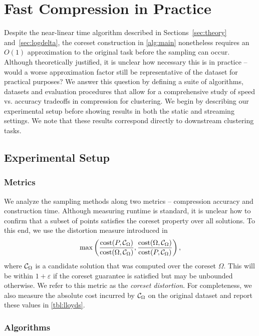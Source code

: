 \section{Fast Compression in Practice}

Despite the near-linear time algorithm described in Sections~\ref{sec:theory} and~\ref{sec:logdelta}, the coreset construction in \ref{alg:main} nonetheless
requires an $O(1)$ approximation to the original task before the sampling can occur. Although theoretically justified, it is unclear how necessary this is in
practice -- would a worse approximation factor still be representative of the dataset for practical purposes? We answer this question by defining a suite of
algorithms, datasets and evaluation procedures that allow for a comprehensive study of speed vs. accuracy tradeoffs in compression for clustering.  We begin by
describing our experimental setup before showing results in both the static and streaming settings.  We note that these results correspond directly to
downstream clustering tasks.

\subsection{Experimental Setup}
\subsubsection{Metrics}
\label{sssec:metrics}

We analyze the sampling methods along two metrics -- compression accuracy and construction time. Although measuring runtime is standard, it is unclear how to
confirm that a subset of points satisfies the coreset property over all solutions. To this end, we use the distortion measure introduced
in~\cite{chrisESA} \[ \max \left( \dfrac{\operatorname{cost}(P, \mathcal C_{\Omega})}{\operatorname{cost}(\Omega, \mathcal C_{\Omega})}, \dfrac{\operatorname{cost}(\Omega, \mathcal C_{\Omega})}{\operatorname{cost}(P, \mathcal C_{\Omega})} \right),\] where
$\mathcal C_{\Omega}$ is a candidate solution that was computed over the coreset $\Omega$. This will be within $1+\varepsilon$ if the coreset guarantee is satisfied but may be
unbounded otherwise.  We refer to this metric as the \emph{coreset distortion}.  For completeness, we also measure the absolute cost incurred by $\mathcal C_\Omega$ on
the original dataset and report these values in \cref{tbl:lloyds}.

\subsubsection{Algorithms}
\label{ssec:algorithms}

